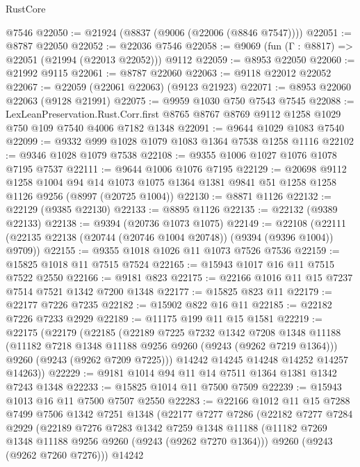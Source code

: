 \begin{lexlean}{RustCore}
\begin{coremodule}
    @7546
@22050 := @21924 (@8837 (@9006 (@22006 (@8846 @7547))))
@22051 := @8787 @22050
@22052 := @22036 @7546
@22058 := @9069 (fun (Γ : @8817) => @22051 (@21994 (@22013 @22052))) @9112
@22059 := @8953 @22050
@22060 := @21992 @9115
@22061 := @8787 @22060
@22063 := @9118 @22012 @22052
@22067 := @22059 (@22061 @22063) (@9123 @21923)
@22071 := @8953 @22060 @22063 (@9128 @21991)
@22075 := @9959 @1030 @750 @7543 @7545
@22088 := LexLeanPreservation.Rust.Corr.first
    @8765
    @8767
    @8769
    @9112
    @1258
    @1029
    @750
    @109
    @7540
    @4006
    @7182
    @1348
@22091 := @9644 @1029 @1083 @7540
@22099 := @9332 @999 @1028 @1079 @1083 @1364 @7538 @1258 @1116
@22102 := @9346 @1028 @1079 @7538
@22108 := @9355 @1006 @1027 @1076 @1078 @7195 @7537
@22111 := @9644 @1006 @1076 @7195
@22129 := @20698
    @9112
    @1258
    @1004
    @94
    @14
    @1073
    @1075
    @1364
    @1381
    @9841
    @51
    @1258
    @1258
    @1126
    @9256
    (@8997 (@20725 @1004))
@22130 := @8871 @1126
@22132 := @22129 (@9385 @22130)
@22133 := @8895 @1126
@22135 := @22132 (@9389 @22133)
@22138 := @9394 (@20736 @1073 @1075)
@22149 := @22108 (@22111 (@22135 @22138 (@20744 (@20746 @1004 @20748)) (@9394 (@9396 @1004)) @9709))
@22155 := @9355 @1018 @1026 @11 @1073 @7526 @7536
@22159 := @15825 @1018 @11 @7515 @7524
@22165 := @15943 @1017 @16 @11 @7515 @7522 @2550
@22166 := @9181 @823
@22175 := @22166 @1016 @11 @15 @7237 @7514 @7521 @1342 @7200 @1348
@22177 := @15825 @823 @11
@22179 := @22177 @7226 @7235
@22182 := @15902 @822 @16 @11
@22185 := @22182 @7226 @7233 @2929
@22189 := @11175 @199 @11 @15 @1581
@22219 := @22175
    (@22179
      (@22185
        (@22189
          @7225
          @7232
          @1342
          @7208
          @1348
          @11188
          (@11182 @7218 @1348 @11188 @9256 @9260 (@9243 (@9262 @7219 @1364)))
          @9260
          (@9243 (@9262 @7209 @7225)))
        @14242
        @14245
        @14248
        @14252
        @14257
        @14263))
@22229 := @9181 @1014 @94 @11 @14 @7511 @1364 @1381 @1342 @7243 @1348
@22233 := @15825 @1014 @11 @7500 @7509
@22239 := @15943 @1013 @16 @11 @7500 @7507 @2550
@22283 := @22166
    @1012
    @11
    @15
    @7288
    @7499
    @7506
    @1342
    @7251
    @1348
    (@22177
      @7277
      @7286
      (@22182
        @7277
        @7284
        @2929
        (@22189
          @7276
          @7283
          @1342
          @7259
          @1348
          @11188
          (@11182 @7269 @1348 @11188 @9256 @9260 (@9243 (@9262 @7270 @1364)))
          @9260
          (@9243 (@9262 @7260 @7276)))
        @14242

\end{coremodule}
\end{lexlean}
